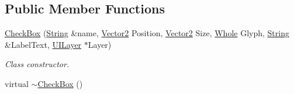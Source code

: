 \subsection*{Public Member Functions}
\begin{DoxyCompactItemize}
\item 
\hyperlink{classphys_1_1UI_1_1CheckBox_a39113092c3f954c2cdef76c54b1a434e}{CheckBox} (\hyperlink{namespacephys_aa03900411993de7fbfec4789bc1d392e}{String} \&name, \hyperlink{classphys_1_1Vector2}{Vector2} Position, \hyperlink{classphys_1_1Vector2}{Vector2} Size, \hyperlink{namespacephys_a460f6bc24c8dd347b05e0366ae34f34a}{Whole} Glyph, \hyperlink{namespacephys_aa03900411993de7fbfec4789bc1d392e}{String} \&LabelText, \hyperlink{classphys_1_1UILayer}{UILayer} $\ast$Layer)
\begin{DoxyCompactList}\small\item\em Class constructor. \item\end{DoxyCompactList}\item 
\hypertarget{classphys_1_1UI_1_1CheckBox_a60c4d62c357a7158d69888a367b5dc56}{
virtual \hyperlink{classphys_1_1UI_1_1CheckBox_a60c4d62c357a7158d69888a367b5dc56}{$\sim$CheckBox} ()}
\label{dd/d10/classphys_1_1UI_1_1CheckBox_a60c4d62c357a7158d69888a367b5dc56}


\end{DoxyCompactItemize}
